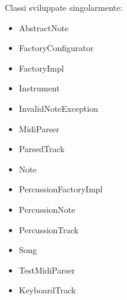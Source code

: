\documentclass[a4paper,12pt]{report}
\begin{document}
Classi sviluppate singolarmente:
{
\begin{itemize}
	\item AbstractNote
	\item FactoryConfigurator
	\item FactoryImpl
	\item Instrument
	\item InvalidNoteException
	\item MidiParser
	\item ParsedTrack
	\item Note
	\item PercussionFactoryImpl
	\item PercussionNote
	\item PercussionTrack
	\item Song
	\item TestMidiParser
	\item KeyboardTrack
\end{itemize}
}
\hfill\break
\newpage
\end{document}
